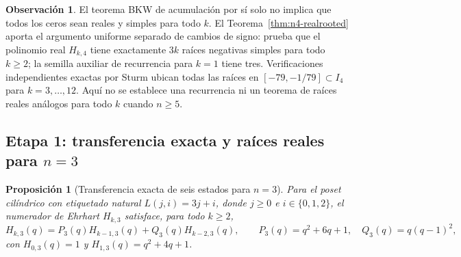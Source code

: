 \documentclass[11pt,a4paper]{article}
\newtheorem{proposition}[theorem]{Proposición}
\theoremstyle{definition}
\newtheorem{remark}[theorem]{Observación}
\begin{document}
\begin{remark}
El teorema BKW de acumulación por sí solo no implica que todos los ceros
sean reales y simples para todo $k$. El Teorema~\ref{thm:n4-realrooted}
aporta el argumento uniforme separado de cambios de signo: prueba que
el polinomio real $H_{k,4}$ tiene exactamente $3k$ raíces negativas
simples para todo $k\ge2$; la semilla auxiliar de recurrencia para
$k=1$ tiene tres. Verificaciones independientes exactas por
Sturm ubican todas las raíces en $[-79,-1/79]\subset I_4$ para
$k=3,\ldots,12$. Aquí no se establece una recurrencia ni un teorema de
raíces reales análogos para todo $k$ cuando $n\ge5$.
\end{remark}

\subsection[Etapa 1: transferencia exacta y raíces reales para n=3]{Etapa 1: transferencia exacta y raíces reales para $n=3$}
\label{sec:n3-raices}

\begin{proposition}[Transferencia exacta de seis estados para $n=3$]
\label{prop:n3-transfer}
Para el poset cilíndrico con etiquetado natural
$L(j,i)=3j+i$, donde $j\ge0$ e $i\in\{0,1,2\}$, el numerador de
Ehrhart $H_{k,3}$ satisface, para todo $k\ge2$,
\[
H_{k,3}(q)=P_3(q)H_{k-1,3}(q)+Q_3(q)H_{k-2,3}(q),
\qquad P_3(q)=q^2+6q+1,\quad Q_3(q)=q(q-1)^2,
\]
con $H_{0,3}(q)=1$ y $H_{1,3}(q)=q^2+4q+1$.
\end{proposition}
\end{document}
